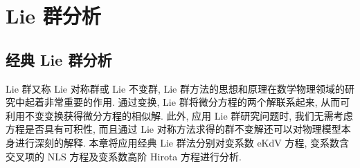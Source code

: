 ﻿%
\chapter{Lie 群分析}
\section{经典 Lie 群分析}
Lie 群又称 Lie 对称群或 Lie 不变群, Lie 群方法的思想和原理在数学物理领域的研究中起着非常重要的作用. 通过变换, Lie 群将微分方程的两个解联系起来, 从而可利用不变变换获得微分方程的相似解. 此外, 应用 Lie 群研究问题时, 我们无需考虑方程是否具有可积性, 而且通过 Lie 对称方法求得的群不变解还可以对物理模型本身进行深刻的解释. 本章将应用经典 Lie 群法分别对变系数 eKdV 方程, 变系数含交叉项的 NLS 方程及变系数高阶 Hirota 方程进行分析.
%
%
%
%
%
